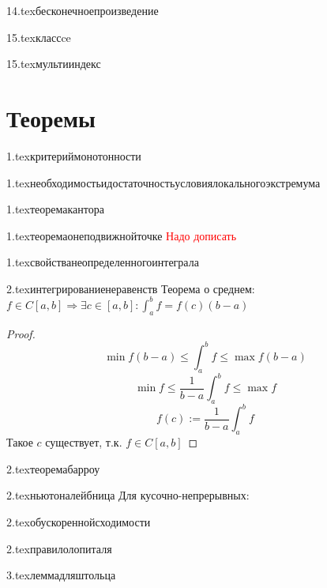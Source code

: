 {14.tex}{бесконечноепроизведение}

{15.tex}{классce}

{15.tex}{мультииндекс}

\section{Теоремы}

{1.tex}{критериймонотонности}

{1.tex}{необходимостьидостаточностьусловиялокальногоэкстремума}

{1.tex}{теоремакантора}

{1.tex}{теоремаонеподвижнойточке}
\textcolor{red}{Надо дописать}

{1.tex}{свойстванеопределенногоинтеграла}
\label{integralproperties}

{2.tex}{интегрированиенеравенств}
Теорема о среднем: $f\in C[a,b] \Rightarrow \exists c\in[a,b] : \int_a^b f = f(c)(b-a)$
\begin{proof}
    $$\min f(b-a)\le \int_a^b f \le \max f(b-a)$$
    $$\min f\le \frac{1}{b-a}\int_a^b f \le \max f$$
    $$f(c) := \frac{1}{b-a}\int_a^b f$$
    Такое $c$ существует, т.к. $f\in C[a,b]$
\end{proof}

{2.tex}{теоремабарроу}

{2.tex}{ньютоналейбница}
Для кусочно-непрерывных:\\

{2.tex}{обускореннойсходимости}

{2.tex}{правилолопиталя}

{3.tex}{леммадляштольца}

